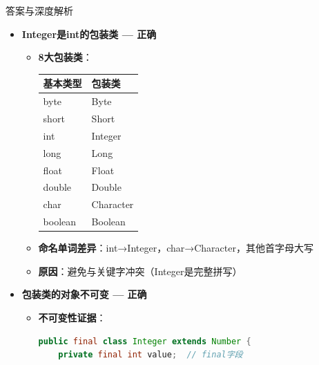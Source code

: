 \documentclass[12pt, a4paper]{ctexart}
\begin{document}
\begin{enumerate}[label=\textbf{\arabic*.}]
\begin{bluebox}{答案与深度解析}
\begin{itemize}[leftmargin=*, nosep, label={}]
			      \item[B] \textbf{Integer是int的包装类 — 正确}
			            \begin{itemize}[label={}, leftmargin=*, nosep]
				            \item \textbf{8大包装类}：
				                  \begin{tabular}{|l|l|}
					                  \hline
					                  \textbf{基本类型} & \textbf{包装类} \\ \hline
					                  byte          & Byte         \\ \hline
					                  short         & Short        \\ \hline
					                  int           & Integer      \\ \hline
					                  long          & Long         \\ \hline
					                  float         & Float        \\ \hline
					                  double        & Double       \\ \hline
					                  char          & Character    \\ \hline
					                  boolean       & Boolean      \\ \hline
				                  \end{tabular}
				            \item \textbf{命名单词差异}：int→Integer，char→Character，其他首字母大写
				            \item \textbf{原因}：避免与关键字冲突（Integer是完整拼写）
			            \end{itemize}

			      \item[C] \textbf{包装类的对象不可变 — 正确}
			            \begin{itemize}[label={}, leftmargin=*, nosep]
				            \item \textbf{不可变性证据}：
				                  \begin{lstlisting}[language=Java]
public final class Integer extends Number {
    private final int value;  // final字段


\end{lstlisting}
\end{itemize}
\end{itemize}
\end{bluebox}
\end{enumerate}
\end{document}
